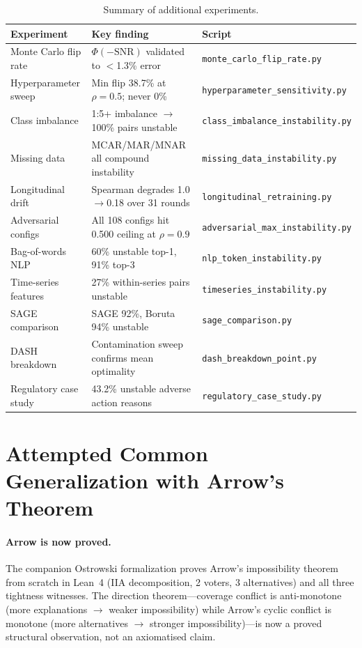 \documentclass{article}
\begin{document}
\begin{table}[t]
\centering
\caption{Summary of additional experiments.}
\label{tab:experiment-summary-def}
\small
\begin{tabular}{@{}lll@{}}
\toprule
Experiment & Key finding & Script \\
\midrule
Monte Carlo flip rate & $\Phi(-\text{SNR})$ validated to $<$1.3\% error & \texttt{monte\_carlo\_flip\_rate.py} \\
Hyperparameter sweep & Min flip 38.7\% at $\rho{=}0.5$; never 0\% & \texttt{hyperparameter\_sensitivity.py} \\
Class imbalance & 1:5+ imbalance $\to$ 100\% pairs unstable & \texttt{class\_imbalance\_instability.py} \\
Missing data & MCAR/MAR/MNAR all compound instability & \texttt{missing\_data\_instability.py} \\
Longitudinal drift & Spearman degrades 1.0$\to$0.18 over 31 rounds & \texttt{longitudinal\_retraining.py} \\
Adversarial configs & All 108 configs hit 0.500 ceiling at $\rho{=}0.9$ & \texttt{adversarial\_max\_instability.py} \\
Bag-of-words NLP & 60\% unstable top-1, 91\% top-3 & \texttt{nlp\_token\_instability.py} \\
Time-series features & 27\% within-series pairs unstable & \texttt{timeseries\_instability.py} \\
SAGE comparison & SAGE 92\%, Boruta 94\% unstable & \texttt{sage\_comparison.py} \\
DASH breakdown & Contamination sweep confirms mean optimality & \texttt{dash\_breakdown\_point.py} \\
Regulatory case study & 43.2\% unstable adverse action reasons & \texttt{regulatory\_case\_study.py} \\
\bottomrule
\end{tabular}
\end{table}

\section{Attempted Common Generalization with Arrow's Theorem}
\label{sec:arrow-generalization}

\paragraph{Arrow is now proved.}
The companion Ostrowski formalization proves Arrow's impossibility theorem from scratch in Lean~4 (IIA decomposition, 2 voters, 3 alternatives) and all three tightness witnesses. The direction theorem---coverage conflict is anti-monotone (more explanations $\to$ weaker impossibility) while Arrow's cyclic conflict is monotone (more alternatives $\to$ stronger impossibility)---is now a proved structural observation, not an axiomatised claim.
\end{document}
